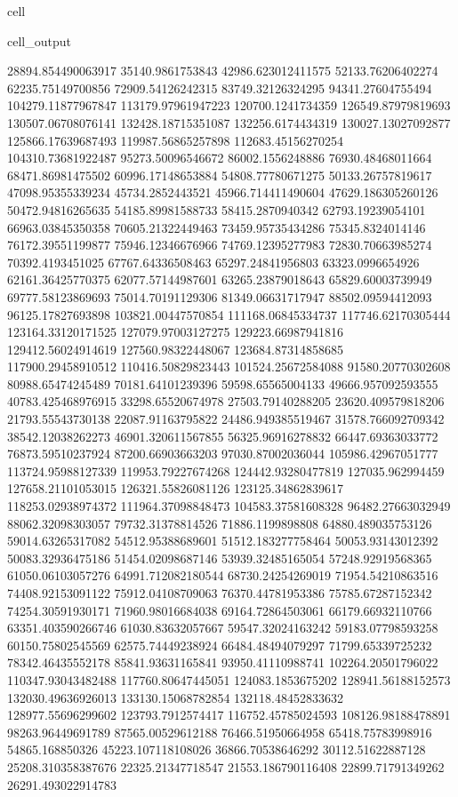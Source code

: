 \documentclass[letterpaper,10pt,english]{jupyterBook}
\begin{document}
\begin{sphinxuseclass}{cell}
\begin{sphinxVerbatimOutput}
\begin{sphinxuseclass}{cell_output}
\begin{sphinxVerbatim}[commandchars=\\\{\}]
28894.854490063917  35140.9861753843  42986.623012411575  52133.76206402274  62235.75149700856  72909.54126242315  83749.32126324295  94341.27604755494  104279.11877967847  113179.97961947223  120700.1241734359  126549.87979819693  130507.06708076141  132428.18715351087  132256.6174434319  130027.13027092877  125866.17639687493  119987.56865257898  112683.45156270254  104310.73681922487  95273.50096546672  86002.1556248886  76930.48468011664  68471.86981475502  60996.17148653884  54808.77780671275  50133.26757819617  47098.95355339234  45734.2852443521  45966.714411490604  47629.186305260126  50472.94816265635  54185.89981588733  58415.2870940342  62793.19239054101  66963.03845350358  70605.21322449463  73459.95735434286  75345.8324014146  76172.39551199877  75946.12346676966  74769.12395277983  72830.70663985274  70392.4193451025  67767.64336508463  65297.24841956803  63323.0996654926  62161.36425770375  62077.57144987601  63265.23879018643  65829.60003739949  69777.58123869693  75014.70191129306  81349.06631717947  88502.09594412093  96125.17827693898  103821.00447570854  111168.06845334737  117746.62170305444  123164.33120171525  127079.97003127275  129223.66987941816  129412.56024914619  127560.98322448067  123684.87314858685  117900.29458910512  110416.50829823443  101524.25672584088  91580.20770302608  80988.65474245489  70181.64101239396  59598.65565004133  49666.957092593555  40783.425468976915  33298.65520674978  27503.79140288205  23620.409579818206  21793.55543730138  22087.91163795822  24486.949385519467  
31578.766092709342  38542.12038262273  46901.320611567855  56325.96916278832  66447.69363033772  76873.59510237924  87200.66903663203  97030.87002036044  105986.42967051777  113724.95988127339  119953.79227674268  124442.93280477819  127035.962994459  127658.21101053015  126321.55826081126  123125.34862839617  118253.02938974372  111964.37098848473  104583.37581608328  96482.27663032949  88062.32098303057  79732.31378814526  71886.1199898808  64880.489035753126  59014.63265317082  54512.95388689601  51512.183277758464  50053.93143012392  50083.32936475186  51454.02098687146  53939.32485165054  57248.92919568365  61050.06103057276  64991.712082180544  68730.24254269019  71954.54210863516  74408.92153091122  75912.04108709063  76370.44781953386  75785.67287152342  74254.30591930171  71960.98016684038  69164.72864503061  66179.66932110766  63351.403590266746  61030.83632057667  59547.32024163242  59183.07798593258  60150.75802545569  62575.74449238924  66484.48494079297  71799.65339725232  78342.46435552178  85841.93631165841  93950.41110988741  102264.20501796022  110347.93043482488  117760.80647445051  124083.1853675202  128941.56188152573  132030.49636926013  133130.15068782854  132118.48452833632  128977.55696299602  123793.7912574417  116752.45785024593  108126.98188478891  98263.96449691789  87565.00529612188  76466.51950664958  65418.75783998916  54865.168850326  45223.107118108026  36866.70538646292  30112.51622887128  25208.310358387676  22325.21347718547  21553.186790116408  22899.71791349262  26291.493022914783  

\end{sphinxVerbatim}
\end{sphinxuseclass}
\end{sphinxVerbatimOutput}
\end{sphinxuseclass}
\end{document}
